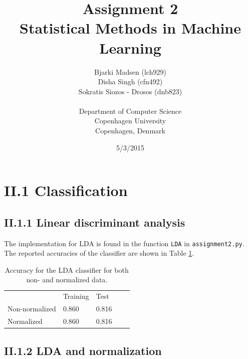\documentclass[12pt]{article}
\newcommand{\assignmentname}{Assignment 2}
\newcommand{\coursename}{Statistical Methods in Machine Learning}
\newcommand{\studentnameOne}{Bjarki Madsen (lch929)}
\newcommand{\studentnameTwo}{Disha Singh (cfn492)}
\newcommand{\studentnameThree}{Sokratis Siozos - Drosos (dnb823)}
\newcommand{\department}{Department of Computer Science}
\newcommand{\institution}{Copenhagen University}
\newcommand{\location}{Copenhagen, Denmark}
\begin{document}
\renewcommand\refname{References}

\title{\assignmentname \\ {\Large {\textsc \coursename}}}
\author{
        \studentnameOne \\
        \studentnameTwo \\
        \studentnameThree \\ \\
                \department \\
        \institution \\
        \location
}
\date{5/3/2015}

\maketitle
\thispagestyle{empty}

\pagebreak

\section*{II.1 Classification}

  \subsection*{II.1.1 Linear discriminant analysis}

    The implementation for LDA is found in the function \texttt{LDA} in \texttt{assignment2.py}. The reported accuracies of the classifier are shown in Table \ref{table:accuracy_LDA}.

    \begin{table}[h]
      \centering
      \begin{tabular}{lllll}
        \cline{2-3}
        \multicolumn{1}{l|}{}                & \multicolumn{1}{l|}{Training} & \multicolumn{1}{l|}{Test}  &  &  \\ \cline{1-3}
        \multicolumn{1}{|l|}{Non-normalized} & \multicolumn{1}{l|}{0.860}    & \multicolumn{1}{l|}{0.816} &  &  \\
        \multicolumn{1}{|l|}{Normalized}     & \multicolumn{1}{l|}{0.860}    & \multicolumn{1}{l|}{0.816} &  &  \\ \cline{1-3}
        \end{tabular}
      \caption{Accuracy for the LDA classifier for both non- and normalized data. }
      \label{table:accuracy_LDA}
    \end{table}

  \subsection*{II.1.2 LDA and normalization} 
\end{document}
